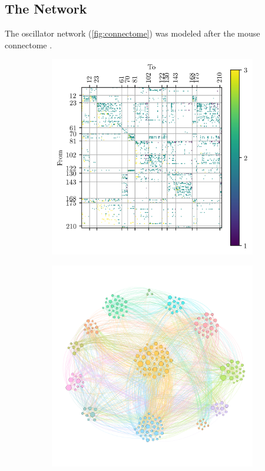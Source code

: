 \documentclass{beamer}
\begin{document}
\begin{frame}[t]
\begin{multicols}{3}
    \section{The Network}
    The oscillator network (\cref{fig:connectome}) was modeled after the mouse connectome \cite{Oh2014}.
    \begin{figure}
      \centering
      \begin{subfigure}{0.49\columnwidth}
        \centering
        \includegraphics[width=0.99\textwidth]{figure/n}
        \caption{}
        \label{fig:connectome_matrix}
      \end{subfigure}%
      \begin{subfigure}{0.49\columnwidth}
        \centering
        \includegraphics[width=0.99\textwidth]{figure/network}

\end{subfigure}
\end{figure}
\end{multicols}
\end{frame}
\end{document}
